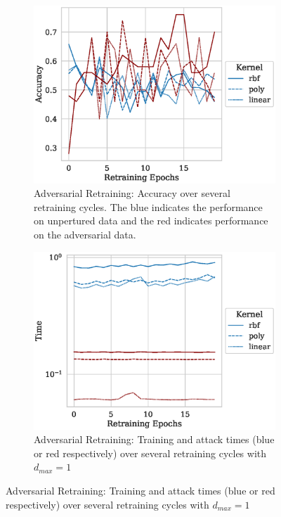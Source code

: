 \documentclass[fonts]{icst}
\begin{document}
\begin{figure}
     \centering
     \begin{subfigure}[b]{0.45\textwidth}
         \centering
         \includegraphics[width=\textwidth]{./generated/retrain_accuracy.eps}
         \caption{Adversarial Retraining: Accuracy over several retraining cycles. The blue indicates the performance on unpertured data and the red indicates performance on the adversarial data.}
        \label{fig:retrain_acc}
     \end{subfigure}
     \hfill
     \begin{subfigure}[b]{0.45\textwidth}
         \centering
         \includegraphics[width=\textwidth]{./generated/retrain_time.eps}
         \caption{Adversarial Retraining: Training and attack times (blue or red respectively) over several retraining cycles with $d_{max} = 1$}

\end{subfigure}
\end{figure}
\end{document}
